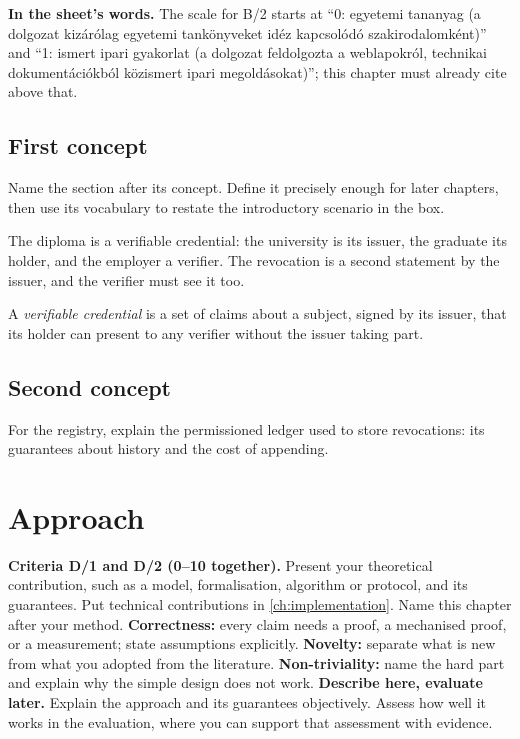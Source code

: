 \textbf{In the sheet's words.} The scale for B/2 starts at \enquote{0: egyetemi tananyag (a dolgozat kizárólag egyetemi tankönyveket idéz kapcsolódó szakirodalomként)} and \enquote{1: ismert ipari gyakorlat (a dolgozat feldolgozta a weblapokról, technikai dokumentációkból közismert ipari megoldásokat)}; this chapter must already cite above that.

\subsection[First concept]{First concept\skimmark}\label{app:chapters:first-concept}
Name the section after its concept. Define it precisely enough for later chapters, then use its vocabulary to restate the introductory scenario in the box.
\begin{runningexample}
The diploma is a verifiable credential: the university is its \gls{issuer}, the graduate its \gls{holder}, and the employer a \gls{verifier}. The revocation is a second statement by the issuer, and the verifier must see it too.
\end{runningexample}
\begin{definition}\label{def:guide:vc}
A \emph{verifiable credential} is a set of claims about a subject, signed by its issuer, that its holder can present to any verifier without the issuer taking part.
\end{definition}

\subsection{Second concept}\label{app:chapters:second-concept}
For the registry, explain the permissioned ledger used to store revocations: its guarantees about history and the cost of appending.

\section{Approach}\label{app:chapters:approach}
\textbf{Criteria D/1 and D/2 (0--10 together).} Present your theoretical contribution, such as a model, formalisation, algorithm or protocol, and its guarantees. Put technical contributions in \cref{ch:implementation}. Name this chapter after your method.
\textbf{Correctness:} every claim needs a proof, a mechanised proof, or a measurement; state assumptions explicitly.
\textbf{Novelty:} separate what is new from what you adopted from the literature.
\textbf{Non-triviality:} name the hard part and explain why the simple design does not work.
\textbf{Describe here, evaluate later.} Explain the approach and its guarantees objectively. Assess how well it works in the evaluation, where you can support that assessment with evidence.

